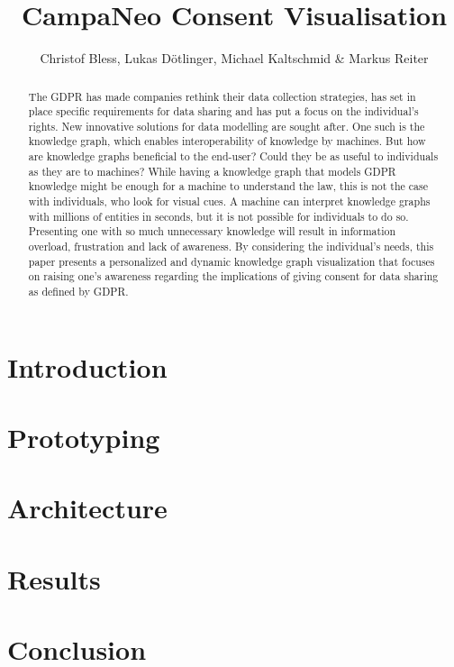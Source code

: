 \documentclass{article}
\title{CampaNeo Consent Visualisation}
\author{Christof Bless, Lukas Dötlinger, Michael Kaltschmid \& Markus Reiter}
\begin{document}
\maketitle

\begin{abstract}
The GDPR has made companies rethink their data collection strategies, has set in place specific requirements for data sharing and has put a focus on the individual’s rights. New innovative solutions for data modelling are sought after. One such is the knowledge graph, which enables interoperability of knowledge by machines. But how are knowledge graphs beneficial to the end-user? Could they be as useful to individuals as they are to  machines? While having a knowledge graph that models GDPR knowledge might be enough for a machine to understand the law, this is not the case with individuals, who look for visual cues. A machine can interpret knowledge graphs with millions of entities in seconds, but it is not possible for individuals to do so. Presenting one with so much unnecessary knowledge will result in information overload, frustration and lack of awareness.
By considering the individual’s needs, this paper presents a personalized and dynamic knowledge graph visualization that focuses on raising one’s awareness regarding the implications of giving consent for data sharing as defined by GDPR.
\end{abstract}

\newpage

\section{Introduction}
\label{sec:introduction}


\section{Prototyping}
\label{sec:prototyping}


\section{Architecture}
\label{sec:architecture}


\section{Results}
\label{sec:results}


\section{Conclusion}
\label{sec:conclusion}


\newpage
\printbibliography
\end{document}
